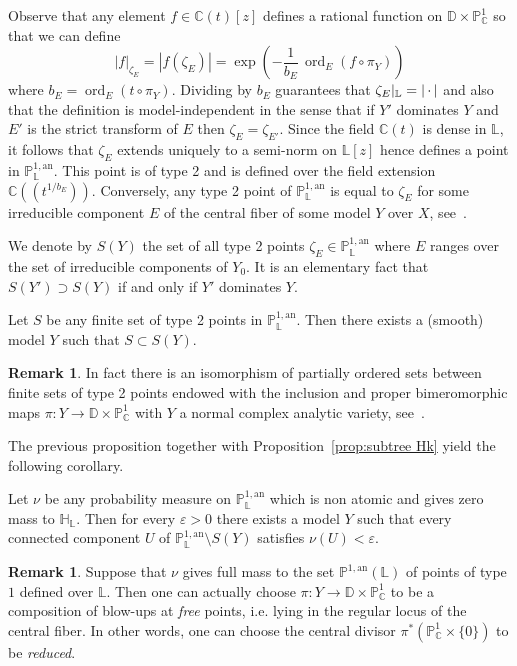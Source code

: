 \documentclass[10pt]{amsart}
\theoremstyle{definition}\newtheorem{defi}[theo]{Definition}\newtheorem{rema}[theo]{Remark}\newtheorem{exam}[theo]{Example}\newtheorem{exem}[theo]{Example}\newtheorem{nota}[theo]{Notation}
\DeclareMathOperator{\ord}{ord}
\newcommand{\cc}{\mathbb{C}}
\newcommand{\hh}{\mathbb{H}}
\newcommand{\D}{\mathbb{D}}
\newcommand{\an}{\mathrm{an}}
\newcommand{\e}{\varepsilon}
\newcommand{\abs}[1]{\left\vert#1\right\vert}
\newcommand{\PP}{\mathbb{P}}
\newcommand{\berkl}{\mathbb P^{1,\an}_{\Laurent}}
\newcommand{\Laurent}{\mathbb{L}}
\newcommand{\rest}[1]{ \arrowvert_{#1}}
\begin{document}
Observe that any element $f\in \cc(t)[z]$ defines a rational function on $\D \times \PP^1_\cc$ so that we can define
\[
\abs{f}_{\zeta_E} = |f(\zeta_E)| = \exp \left(- \frac1{b_E}\, \ord_E(f \circ \pi_Y)\right)
\]
where $b_E = \ord_E (t \circ \pi_Y)$. Dividing by $b_E$ guarantees that $\zeta_E\rest{\Laurent} = \abs{{\,\cdot\,}}$ and also that the definition is model-independent in the sense that if $Y'$ dominates $Y$ and $E'$ is the strict transform of $E$ then $\zeta_E=\zeta_{E'}$. Since the field $\cc(t)$ is dense in $\Laurent$, it follows that $\zeta_E$ extends uniquely to a semi-norm on $\Laurent[z]$ hence defines a point in $\PP^{1,\an}_{\Laurent}$. This point is of type 2 and is defined over the field extension $\cc(\!(t^{1/{b_E}})\!)$. Conversely, any type 2 point of $\PP^{1,\an}_{\Laurent}$ is equal to $\zeta_E$ for some irreducible component $E$ of the central fiber of some model $Y$ over $X$, see~\cite[Lem.~7.16]{NL}.

We denote by $ S(Y)$ the set of all type 2 points $\zeta_E \in \PP^{1,\an}_{\Laurent}$ where $E$ ranges over the set of irreducible components of $Y_0$. It is an elementary fact that $S(Y') \supset S(Y)$ if and only if $Y'$ dominates $Y$.

\begin{prop}
Let $S$ be any finite set of type 2 points in $\PP^{1,\an}_{\Laurent}$. Then there exists a (smooth) model $Y$ such that $S \subset S(Y)$.
\end{prop}

\begin{rema}
In fact there is an isomorphism of partially ordered sets between finite sets of type 2 points endowed with the inclusion and proper bimeromorphic maps $\pi: Y \to \D \times \PP^1_\cc$ with $Y$ a normal complex analytic variety, see~\cite[Thm.~7.18]{NL}.
\end{rema}

The previous proposition together with Proposition~\ref{prop:subtree Hk} yield the following corollary.

\begin{coro}\label{cor:cut to small}
Let $\nu$ be any probability measure on $\berkl$ which is non atomic and gives zero mass to $\hh_\Laurent$. Then for every $\e>0$ there exists a model $Y$ such that every connected component $U$ of $\berkl\setminus S(Y)$ satisfies $\nu(U)<\e$.
\end{coro}

\begin{rema}\label{rem:useless}
Suppose that $\nu$ gives full mass to the set $\PP^{1,\an}(\Laurent)$ of points of type $1$ defined over $\Laurent$. Then one can actually choose $\pi: Y \to \D\times \PP^{1}_\cc $ to be a composition of blow-ups at \emph{free} points, i.e. lying in the regular locus of the central fiber. In other words, one can choose the central divisor $\pi^* (\PP^{1}_\cc \times \{ 0 \})$ to be \emph{reduced}.
\end{rema}
\end{document}
